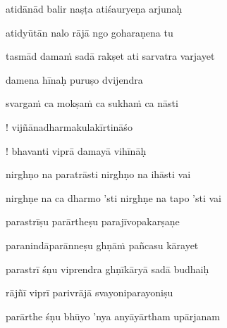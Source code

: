 atidānād balir naṣṭa atiśauryeṇa arjunaḥ \veg\dontdisplaylinenum

atidyūtān nalo rājā ngo goharaṇena tu\thinspace{\dandab} \dontdisplaylinenum

tasmād dama\.m sadā rakṣet ati sarvatra varjayet \veg\dontdisplaylinenum
            \var{\vcd \om\ \msCa}%

\ujvers\nemsloka 
damena hīnaḥ puruṣo dvijendra
\dontdisplaylinenum

\nemslokab 
svarga\.m ca mokṣa\.m ca sukha\.m ca nāsti \danda\dontdisplaylinenum

\nemslokac 
! vijñānadharmakulakīrtināśo
\dontdisplaylinenum

\nemslokad 
! bhavanti viprā damayā vihīnāḥ \veg\dontdisplaylinenum


\vers

nirghṇo na paratrāsti nirghṇo na ihāsti vai\thinspace{\dandab} \dontdisplaylinenum

nirghṇe na ca dharmo 'sti nirghṇe na tapo 'sti vai \veg\dontdisplaylinenum

parastrīṣu parārtheṣu parajīvopakarṣaṇe\thinspace{\dandab} \dontdisplaylinenum

paranindāparānneṣu ghṇā\.m pañcasu kārayet \veg\dontdisplaylinenum

parastrī śṇu viprendra ghṇīkāryā sadā budhaiḥ\thinspace{\dandab} \dontdisplaylinenum

rājñī viprī parivrājā svayoniparayoniṣu \veg\dontdisplaylinenum

parārthe śṇu bhūyo 'nya anyāyārtham upārjanam\thinspace{\dandab} \dontdisplaylinenum

